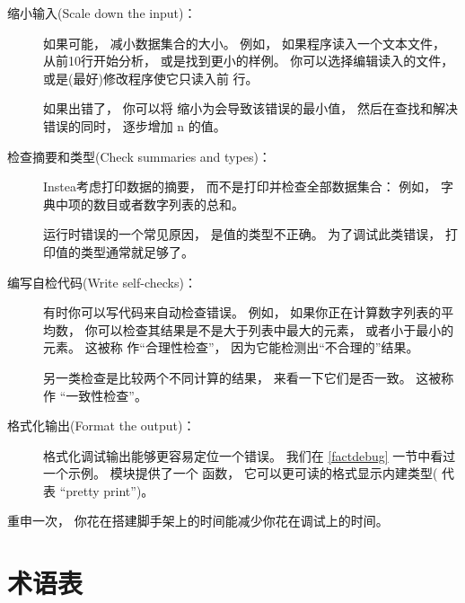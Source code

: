 \begin{description}

\item[缩小输入(Scale down the input)：] 如果可能， 减小数据集合的大小。
    例如， 如果程序读入一个文本文件， 从前10行开始分析， 或是找到更小的样例。
    你可以选择编辑读入的文件， 或是(最好)修改程序使它只读入前  行。

    如果出错了， 你可以将  缩小为会导致该错误的最小值， 然后在查找和解决错误的同时， 逐步增加 n 的值。

\item[检查摘要和类型(Check summaries and types)：] Instea考虑打印数据的摘要， 而不是打印并检查全部数据集合：
    例如， 字典中项的数目或者数字列表的总和。

    运行时错误的一个常见原因， 是值的类型不正确。   为了调试此类错误， 打印值的类型通常就足够了。

\item[编写自检代码(Write self-checks)：]  有时你可以写代码来自动检查错误。   例如， 如果你正在计算数字列表的平均数， 你可以检查其结果是不是大于列表中最大的元素， 或者小于最小的元素。   这被称 作``合理性检查''， 因为它能检测出``不合理的''结果。

  

另一类检查是比较两个不同计算的结果， 来看一下它们是否一致。  这被称作 ``一致性检查''。

\item[格式化输出(Format the output)：] 格式化调试输出能够更容易定位一个错误。   我们在 \ref{factdebug} 一节中看过一个示例。    模块提供了一个  函数， 它可以更可读的格式显示内建类型(  代表 ``pretty print'')。

  

\end{description}


重申一次， 你花在搭建脚手架上的时间能减少你花在调试上的时间。



\section{术语表}


